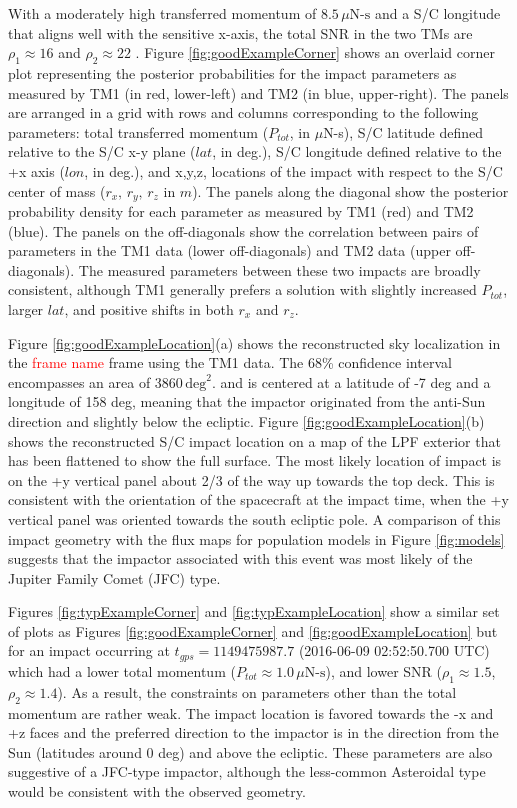 \documentclass[twocolumn, trackchanges]{aastex62}
\newcommand{\red}[1]{\textcolor{red}{#1}}
\begin{document}
\pagebreak

With a moderately high transferred momentum of $8.5\,\mu\textrm{N-s}$ and a S/C longitude that aligns well with the sensitive x-axis, the total SNR in the two TMs are $\rho_1\approx16$ and $\rho_2\approx22$ . Figure \ref{fig:goodExampleCorner} shows an overlaid corner plot representing the posterior probabilities for the impact parameters as measured by TM1 (in red, lower-left) and TM2 (in blue, upper-right).  The panels are arranged in a grid with rows and columns corresponding to the following parameters: total transferred momentum ($P_{tot}$, in $\mu$N-s), S/C latitude defined relative to the S/C x-y plane ($lat$, in deg.), S/C longitude defined relative to the +x axis ($lon$, in deg.), and x,y,z, locations of the impact with respect to the S/C center of mass ($r_x,\,r_y,\,r_z$ in $m$).  The panels along the diagonal show the posterior probability density for each parameter as measured by TM1 (red) and TM2 (blue).  The panels on the off-diagonals show the correlation between pairs of parameters in the TM1 data (lower off-diagonals) and TM2 data (upper off-diagonals). The measured parameters between these two impacts are broadly consistent, although TM1 generally prefers a solution with slightly increased $P_{tot}$, larger $lat$, and positive shifts in both $r_x$ and $r_z$. 

Figure \ref{fig:goodExampleLocation}(a) shows the reconstructed sky localization in the \red{frame name} frame using the TM1 data.  The 68\% confidence interval encompasses an area of 3860$\,\textrm{deg}^2$. and is centered at a latitude of -7 deg and a longitude of 158 deg, meaning that the impactor originated from the anti-Sun direction and slightly below the ecliptic. Figure \ref{fig:goodExampleLocation}(b) shows the reconstructed S/C impact location on a map of the LPF exterior that has been flattened to show the full surface.  The most likely location of impact is on the +y vertical panel about 2/3 of the way up towards the top deck. This is consistent with the orientation of the spacecraft at the impact time, when the +y vertical panel was oriented towards the south ecliptic pole. A comparison of this impact geometry with the flux maps for population models in Figure \ref{fig:models} suggests that the impactor associated with this event was most likely of the Jupiter Family Comet (JFC) type. 

Figures \ref{fig:typExampleCorner} and \ref{fig:typExampleLocation} show a similar set of plots as Figures \ref{fig:goodExampleCorner} and \ref{fig:goodExampleLocation} but for an impact occurring at $t_{gps} = 1149475987.7$ (2016-06-09 02:52:50.700 UTC) which had a lower total momentum ($P_{tot}\approx1.0\,\mu\textrm{N-s}$), and lower SNR ($\rho_1\approx1.5$, $\rho_2\approx1.4$). As a result, the constraints on parameters other than the total momentum are rather weak.  The impact location is favored towards the -x and +z faces and the preferred direction to the impactor is in the direction from the Sun (latitudes around 0 deg) and above the ecliptic. These parameters are also suggestive of a JFC-type impactor, although the less-common Asteroidal type would be consistent with the observed geometry.
\end{document}
